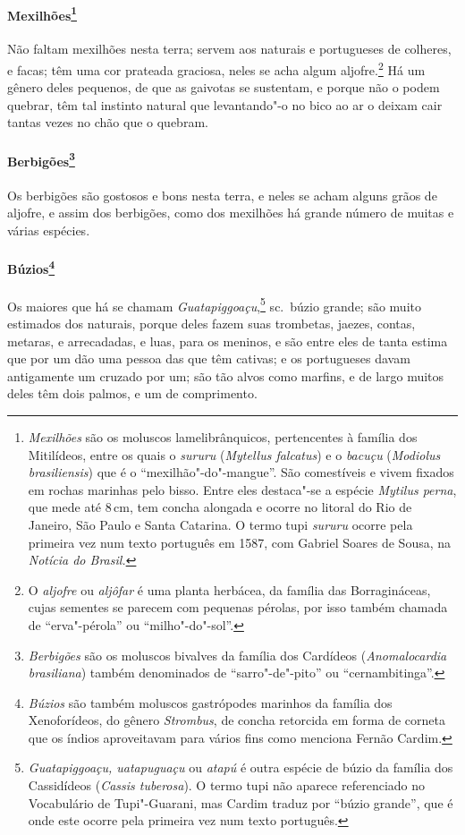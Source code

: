 \paragraph{Mexilhões\footnote{ \textit{Mexilhões} são os moluscos
lamelibrânquicos, pertencentes à família dos Mitilídeos, entre os quais
o \textit{sururu} (\textit{Mytellus falcatus}) e o \textit{bacuçu} (\textit{Modiolus
brasiliensis}) que é o ``mexilhão"-do"-mangue''. São comestíveis e vivem
fixados em rochas marinhas pelo bisso. Entre eles destaca"-se a espécie
\textit{Mytilus perna}, que mede até 8\,cm, tem concha alongada e ocorre
no litoral do Rio de Janeiro, São Paulo e Santa Catarina. O termo tupi
\textit{sururu} ocorre pela primeira vez num texto português em 1587,
com Gabriel Soares de Sousa, na \textit{Notícia do Brasil.}} }
Não faltam mexilhões nesta terra; servem aos naturais e portugueses de
colheres, e facas; têm uma cor prateada graciosa, neles se acha algum
aljofre.\footnote{ O \textit{aljofre} ou \textit{aljôfar} é uma planta
herbácea, da família das Borragináceas, cujas sementes se parecem com
pequenas pérolas, por isso também chamada de ``erva"-pérola'' ou
``milho"-do"-sol''.} Há um gênero deles pequenos, de que as gaivotas se
sustentam, e porque não o podem quebrar, têm tal instinto natural que
levantando"-o no bico ao ar o deixam cair tantas vezes no chão que o quebram. 

\paragraph{Berbigões\footnote{ \textit{Berbigões} são os moluscos
bivalves da família dos Cardídeos (\textit{Anomalocardia brasiliana}) 
também denominados de ``sarro"-de"-pito'' ou ``cernambitinga''.} }
Os berbigões são gostosos e bons nesta terra, e neles se acham alguns
grãos de aljofre, e assim dos berbigões, como dos mexilhões há grande
número de muitas e várias espécies.

\paragraph{Búzios\footnote{ \textit{Búzios} são também moluscos
gastrópodes marinhos da família dos Xenoforídeos, do gênero
\textit{Strombus}, de concha retorcida em forma de corneta que os
índios aproveitavam para vários fins como menciona Fernão Cardim.} }
Os maiores que há se chamam \textit{Guatapiggoaçu},\footnote{ \textit{Guatapiggoaçu, uatapuguaçu} ou \textit{atapú} é
outra espécie de búzio da família dos Cassidídeos (\textit{Cassis
tuberosa}). O termo tupi não aparece referenciado no Vocabulário de
Tupi"-Guarani, mas Cardim traduz por ``búzio grande'', que é onde este
ocorre pela primeira vez num texto português.} sc.~búzio grande; são
muito estimados dos naturais, porque deles fazem suas trombetas,
jaezes, contas, metaras, e arrecadadas, e luas, para os meninos, e são
entre eles de tanta estima que por um dão uma pessoa das que têm
cativas; e os portugueses davam antigamente um cruzado por um; são tão
alvos como marfins, e de largo muitos deles têm dois palmos, e um de comprimento.

